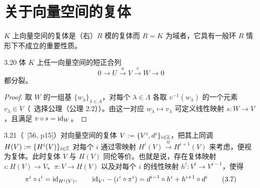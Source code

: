 
\section{关于向量空间的复体}

$K$ 上向量空间的复体是（右）$R$ 模的复体而 $R=K$ 为域者，它具有一般环 $R$ 情形下不成立的重要性质。

\begin{lemma}{3.20} 体 $K$ 上任一向量空间的短正合列
\[
0\to U\xrightarrow{u}V\xrightarrow{v}W\to 0
\]
都分裂。
\end{lemma}

\begin{proof}
取 $W$ 的一组基 $\{w_\lambda\}_{\lambda\in\Lambda}$，对每个 $\lambda\in\Lambda$ 各取 $v^{-1}(w_\lambda)$ 的一个元素 $v_\lambda\in V$（\cf\ 选择公理（公理 2.2））。由这一对应 $w_\lambda\mapsto v_\lambda$ 可定义线性映射 $s\colon W\to V$，且满足 $v\circ s=\mathrm{id}_W$。
\end{proof}


\begin{lemma}{3.21}（\cf\ [56, p15]）对向量空间的复体 $V:=\{V^i,d^i\}_{i\in\mathbb{Z}}$，把其上同调 $H(V):=\{H^i(V)\}_{i\in\mathbb{Z}}$ 对每个 $i$ 通过零映射 $H^i(V)\xrightarrow{0}H^{i+1}(V)$ 来考虑，便视为复体。此时复体 $V$ 与 $H(V)$ 同伦等价。也就是说，存在复体映射 $\iota\colon H(V)\to V$、$\pi\colon V\to H(V)$ 以及对每个 $i$ 的线性映射 $h^i\colon V^i\to V^{i-1}$，使得
\begin{equation}
\pi^i\circ\iota^i=\mathrm{id}_{H^i(V)},\qquad \mathrm{id}_{V^i}-(\iota^i\circ\pi^i)=d^{i-1}\circ h^i+h^{i+1}\circ d^i \tag{3.7}
\end{equation}
\end{lemma}

